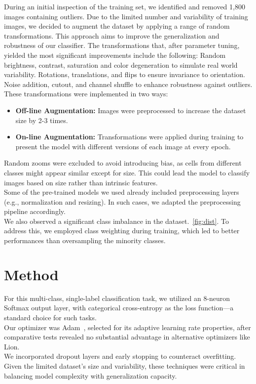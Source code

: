 \documentclass[11pt]{article}
\begin{document}
\begin{multicols}{2}
    During an initial inspection of the training set, we identified and removed 1,800 images containing outliers.
    Due to the limited number and variability of training images, we decided to augment the dataset by applying a range of random transformations. This approach aims to improve the generalization and robustness of our classifier.
    The transformations that, after parameter tuning, yielded the most significant improvements include the following:
    Random brightness, contrast, saturation and color degeneration to simulate real world variability. Rotations, translations, and flips to ensure invariance to orientation. Noise addition, cutout, and channel shuffle to enhance robustness against outliers.\\
    \noindent These transformations were implemented in two ways:
    \begin{itemize}
        \item \textbf{Off-line Augmentation:} Images were preprocessed to increase the dataset size by 2-3 times.
        \item \textbf{On-line Augmentation:} Transformations were applied during training to present the model with different versions of each image at every epoch.
    \end{itemize}
    Random zooms were excluded to avoid introducing bias, as cells from different classes might appear similar except for size. This could lead the model to classify images based on size rather than intrinsic features.\\
    Some of the pre-trained models we used already included preprocessing layers (e.g., normalization and resizing). In such cases, we adapted the preprocessing pipeline accordingly.\\
    We also observed a significant class imbalance in the dataset.~\ref{fig:dist}. To address this, we employed class weighting during training, which led to better performances than oversampling the minority classes.


    \section{Method}

    For this multi-class, single-label classification task, we utilized an 8-neuron Softmax output layer, with categorical cross-entropy as the loss function—a standard choice for such tasks.\\
    Our optimizer was Adam~\cite{Adam}, selected for its adaptive learning rate properties, after comparative tests revealed no substantial advantage in alternative optimizers like Lion.\\
    We incorporated dropout layers and early stopping to counteract overfitting. Given the limited dataset's size and variability, these techniques were critical in balancing model complexity with generalization capacity.


\end{multicols}
\end{document}
